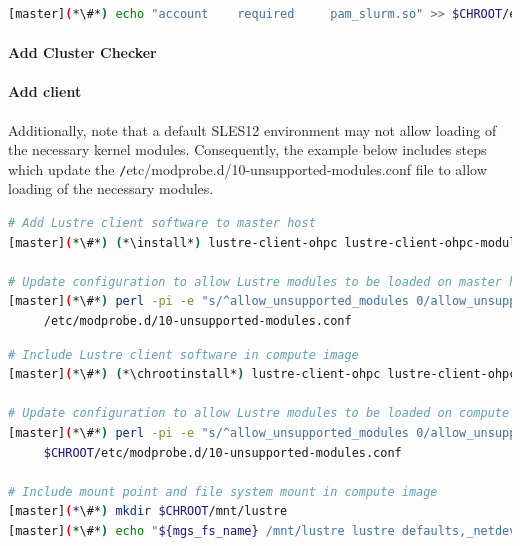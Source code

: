 \documentclass[letterpaper]{article}
\newcommand{\baseOS}{SLES12}
\newcommand{\install}{zypper -n install}
\newcommand{\chrootinstall}{zypper -n --root \$CHROOT install}
\begin{document}


\begin{lstlisting}[language=bash,keywords={},upquote=true]
[master](*\#*) echo "account    required     pam_slurm.so" >> $CHROOT/etc/pam.d/sshd
\end{lstlisting}

\paragraph{Add Cluster Checker} \label{sec:add_clck}


\paragraph{Add \Lustre{} client} \label{sec:lustre_client}


Additionally, note that a default \baseOS{} environment may not allow loading of
the necessary \Lustre{} kernel modules. Consequently, the example below includes
steps which update the {\texttt /etc/modprobe.d/10-unsupported-modules.conf}
file to allow loading of the necessary modules.


\begin{lstlisting}[language=bash,keywords={},upquote=true]
# Add Lustre client software to master host
[master](*\#*) (*\install*) lustre-client-ohpc lustre-client-ohpc-modules

# Update configuration to allow Lustre modules to be loaded on master host
[master](*\#*) perl -pi -e "s/^allow_unsupported_modules 0/allow_unsupported_modules 1/" \
     /etc/modprobe.d/10-unsupported-modules.conf
\end{lstlisting}

\clearpage
\begin{lstlisting}[language=bash,keywords={},upquote=true]
# Include Lustre client software in compute image
[master](*\#*) (*\chrootinstall*) lustre-client-ohpc lustre-client-ohpc-modules

# Update configuration to allow Lustre modules to be loaded on compute hosts
[master](*\#*) perl -pi -e "s/^allow_unsupported_modules 0/allow_unsupported_modules 1/" \
     $CHROOT/etc/modprobe.d/10-unsupported-modules.conf

# Include mount point and file system mount in compute image
[master](*\#*) mkdir $CHROOT/mnt/lustre
[master](*\#*) echo "${mgs_fs_name} /mnt/lustre lustre defaults,_netdev,localflock 0 0" >> $CHROOT/etc/fstab
\end{lstlisting}
\end{document}

